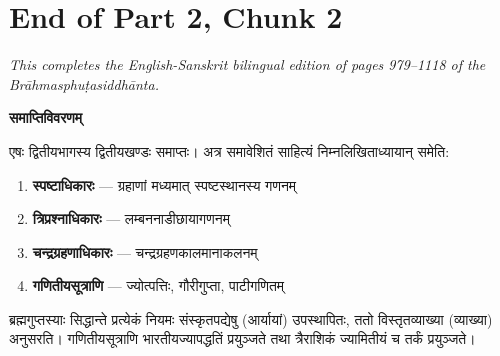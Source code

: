 \documentclass[11pt,a4paper]{article}
\begin{document}
\section*{End of Part 2, Chunk 2}

\begin{center}
\textit{This completes the English-Sanskrit bilingual edition of pages 979--1118 of the Br\=ahmasphu\d{t}asiddh\=anta.}
\end{center}

\vspace{0.5em}

\begin{minipage}[t]{0.48\textwidth}
\small\devanagarifont
\textbf{समाप्तिविवरणम्}

एषः द्वितीयभागस्य द्वितीयखण्डः समाप्तः। अत्र समावेशितं साहित्यं निम्नलिखिताध्यायान् समेति:
\begin{enumerate}[nosep]
\item \textbf{स्पष्टाधिकारः} --- ग्रहाणां मध्यमात् स्पष्टस्थानस्य गणनम्
\item \textbf{त्रिप्रश्नाधिकारः} --- लम्बननाडीछायागणनम्
\item \textbf{चन्द्रग्रहणाधिकारः} --- चन्द्रग्रहणकालमानाकलनम्
\item \textbf{गणितीयसूत्राणि} --- ज्योत्पत्तिः, गौरीगुप्ता, पाटीगणितम्
\end{enumerate}

ब्रह्मगुप्तस्याः सिद्धान्ते प्रत्येकं नियमः संस्कृतपद्येषु (आर्यायां) उपस्थापितः, ततो विस्तृतव्याख्या (व्याख्या) अनुसरति। गणितीयसूत्राणि भारतीयज्यापद्धतिं प्रयुञ्जते तथा त्रैराशिकं ज्यामितीयं च तर्कं प्रयुञ्जते।
\end{minipage}%
\hfill
\end{document}
